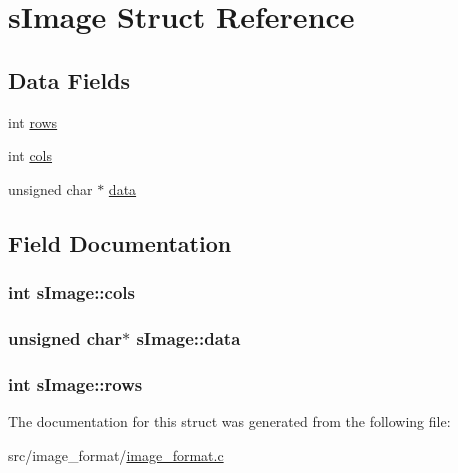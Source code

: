 \hypertarget{structsImage}{\section{s\+Image Struct Reference}
\label{structsImage}
}
\subsection*{Data Fields}
\begin{DoxyCompactItemize}
\item 
int \hyperlink{structsImage_a7acc75cf6bd1af8be5ac3801bf5a909c}{rows}
\item 
int \hyperlink{structsImage_a8afe7b8cf4e980a69f07b4173d05a456}{cols}
\item 
unsigned char $\ast$ \hyperlink{structsImage_aa6f9954c2c570315820119012e7ea1dd}{data}
\end{DoxyCompactItemize}


\subsection{Field Documentation}
\hypertarget{structsImage_a8afe7b8cf4e980a69f07b4173d05a456}{
\subsubsection[{cols}]{\setlength{\rightskip}{0pt plus 5cm}int s\+Image\+::cols}}\label{structsImage_a8afe7b8cf4e980a69f07b4173d05a456}
\hypertarget{structsImage_aa6f9954c2c570315820119012e7ea1dd}{
\subsubsection[{data}]{\setlength{\rightskip}{0pt plus 5cm}unsigned char$\ast$ s\+Image\+::data}}\label{structsImage_aa6f9954c2c570315820119012e7ea1dd}
\hypertarget{structsImage_a7acc75cf6bd1af8be5ac3801bf5a909c}{
\subsubsection[{rows}]{\setlength{\rightskip}{0pt plus 5cm}int s\+Image\+::rows}}\label{structsImage_a7acc75cf6bd1af8be5ac3801bf5a909c}


The documentation for this struct was generated from the following file\+:\begin{DoxyCompactItemize}
\item 
src/image\+\_\+format/\hyperlink{image__format_8c}{image\+\_\+format.\+c}\end{DoxyCompactItemize}
